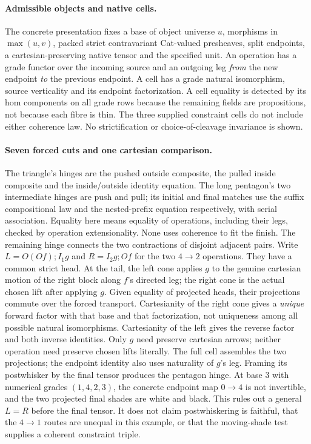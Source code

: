 \documentclass[11pt]{article}
\begin{document}
\paragraph{Admissible objects and native cells.}
The concrete presentation fixes a base of object universe $u$, morphisms in
$\max(u,v)$, packed strict contravariant Cat-valued presheaves,
split endpoints, a cartesian-preserving native tensor and the specified
unit. An operation has a grade functor over the incoming source and an
outgoing leg \emph{from} the new endpoint \emph{to} the previous endpoint.
A cell has a grade natural isomorphism, source verticality and its endpoint
factorization. A cell equality is detected by its hom components on all grade
rows because the remaining fields are propositions, not because each fibre is
thin. The three supplied constraint cells do not include either coherence
law. No strictification or choice-of-cleavage invariance is shown.
\paragraph{Seven forced cuts and one cartesian comparison.}
The triangle's hinges are the pushed outside composite, the pulled inside
composite and the inside/outside identity equation. The long pentagon's
two intermediate hinges are push and pull; its initial and final matches
use the suffix compositional law and the nested-prefix equation respectively,
with serial association. Equality here means equality of operations, including
their legs, checked by operation extensionality. None uses coherence to fit
the finish. The remaining hinge connects the two contractions of disjoint
adjacent pairs. Write $L=O(Of);I_1g$ and $R=I_2g;Of$ for the two
$4\to2$ operations. They have a common strict head. At the tail, the left
cone applies $g$ to the genuine cartesian motion of the right block along
$f$'s directed leg; the right cone is the actual chosen lift after applying
$g$. Given equality of projected heads, their projections commute over
the forced transport. Cartesianity of the right cone gives a
\emph{unique} forward factor with that base and that factorization, not
uniqueness among all possible natural isomorphisms. Cartesianity of the
left gives the reverse factor and both inverse identities. Only $g$ need
preserve cartesian arrows; neither operation need preserve chosen lifts
literally. The full cell assembles the two projections; the endpoint
identity also uses naturality of $g$'s leg. Framing its postwhisker by the
final tensor produces the pentagon hinge. At base $3$ with numerical grades
$(1,4,2,3)$, the concrete endpoint map $0\to4$ is not invertible, and
the two projected final shades are white and black. This rules out a
general $L=R$ before the final tensor. It does not claim postwhiskering
is faithful, that the $4\to1$ routes are unequal in this example, or
that the moving-shade test supplies a coherent constraint triple.
\end{document}
